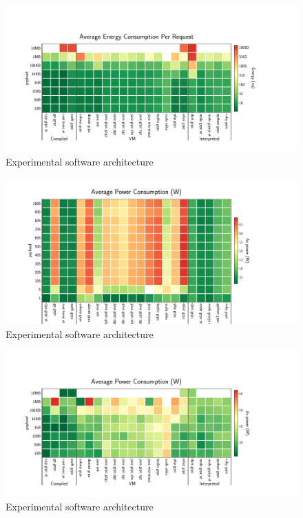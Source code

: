 \begin{figure}[!hbt]
    \begin{center}
        \includegraphics[width=1.2\linewidth]{imgs/energy_cost_payload}
    \end{center}
    \caption{Experimental software architecture}\label{fig:energy_cost_payload}
\end{figure}

\begin{figure}[!hbt]
    \begin{center}
        \includegraphics[width=1.2\linewidth]{imgs/power_consumption_clients}
    \end{center}
    \caption{Experimental software architecture}\label{fig:power_consumption_clients}
\end{figure}


\begin{figure}[!hbt]
    \begin{center}
        \includegraphics[width=1.2\linewidth]{imgs/power_consumption_payload}
    \end{center}
    \caption{Experimental software architecture}\label{fig:power_consumption_payload}
\end{figure}

